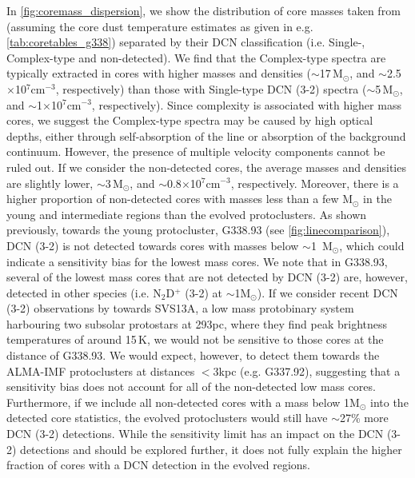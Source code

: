 \documentclass[longauth]{aa} %
\begin{document}
In \cref{fig:coremass_dispersion}, we show the distribution of core masses taken from \citet{louvet22} (assuming the core dust temperature estimates as given in e.g. \cref{tab:coretables_g338}) separated by their DCN classification (i.e. Single-,  Complex-type and non-detected). We find that the Complex-type spectra are typically extracted in cores with higher masses and densities ($\sim$17\,M$_{\odot}$, and $\sim$2.5$\times$10$^7$cm$^{-3}$, respectively) than those with Single-type DCN (3-2) spectra ($\sim$5\,M$_{\odot}$, and $\sim$1$\times$10$^7$cm$^{-3}$, respectively). Since complexity is associated with higher mass cores, we suggest the Complex-type spectra may be caused by high optical depths, either through self-absorption of the line or absorption of the background continuum. However, the presence of multiple velocity components cannot be ruled out. If we consider the non-detected cores, the average masses and densities are slightly lower, $\sim$3\,M$_{\odot}$, and $\sim$0.8$\times$10$^7$cm$^{-3}$, respectively. Moreover, there is a higher proportion of non-detected cores with masses less than a few M$_{\odot}$ in the young and intermediate regions than the evolved protoclusters. As shown previously, towards the young protocluster, G338.93 (see \cref{fig:linecomparison}), DCN (3-2) is not detected towards cores with masses below $\sim$1~M$_{\odot}$, which could indicate a sensitivity bias for the lowest mass cores.
We note that in G338.93, several of the lowest mass cores that are not detected by DCN (3-2) are, however, detected in other species (i.e. N$_2$D$^+$ (3-2) at $\sim$1M$_{\odot}$).
If we consider recent DCN (3-2) observations by \citet{Hsieh2023} towards SVS13A, a low mass protobinary system harbouring two subsolar protostars at 293pc, where they find peak brightness temperatures of around 15\,K, we would not be sensitive to those cores at the distance of G338.93.  We would expect, however, to detect them towards the ALMA-IMF protoclusters at distances $<$3kpc (e.g. G337.92), suggesting that a sensitivity bias does not account for all of the non-detected low mass cores. Furthermore, if we include all non-detected cores with a mass below 1M$_{\odot}$ into the detected core statistics, the evolved protoclusters would still have $\sim$27\% more DCN (3-2) detections. While the sensitivity limit has an impact on the DCN (3-2) detections and should be explored further, it does not fully explain the higher fraction of cores with a DCN detection in the evolved regions. 
\end{document}
